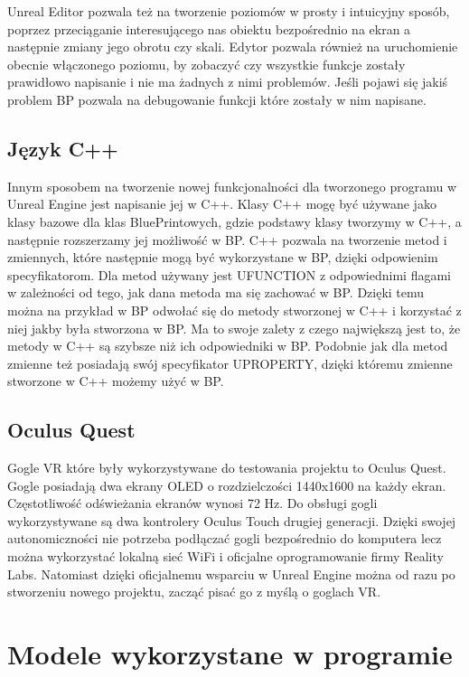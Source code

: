\documentclass[a4paper,12pt,reqno]{article}
\begin{document}
Unreal Editor pozwala też na tworzenie poziomów w prosty i intuicyjny sposób, poprzez przeciąganie interesującego nas obiektu bezpośrednio na ekran a następnie zmiany jego obrotu czy skali. Edytor pozwala również na uruchomienie obecnie włączonego poziomu, by zobaczyć czy wszystkie funkcje zostały prawidłowo napisanie i nie ma żadnych z nimi problemów. Jeśli pojawi się jakiś problem BP pozwala na debugowanie funkcji które zostały w nim napisane. 
\subsection{Język C++}

Innym sposobem na tworzenie nowej funkcjonalności dla tworzonego programu w Unreal Engine jest napisanie jej w C++. Klasy C++ mogę być używane jako klasy bazowe dla klas BluePrintowych, gdzie podstawy klasy tworzymy w C++, a następnie rozszerzamy jej możliwość w BP. C++ pozwala na tworzenie metod i zmiennych, które następnie mogą być wykorzystane w BP, dzięki odpowienim specyfikatorom. Dla metod używany jest UFUNCTION z odpowiednimi flagami w zależności od tego, jak dana metoda ma się zachować w BP. Dzięki temu można na przykład w BP odwołać się do metody stworzonej w C++ i korzystać z niej jakby była stworzona w BP. Ma to swoje zalety z czego największą jest to, że metody w C++ są szybsze niż ich odpowiedniki w BP. Podobnie jak dla metod zmienne też posiadają swój specyfikator UPROPERTY, dzięki któremu zmienne stworzone w C++ możemy użyć w BP.




\subsection{Oculus Quest}

Gogle VR które były wykorzystywane do testowania projektu to Oculus Quest. Gogle posiadają dwa ekrany OLED o rozdzielczości 1440x1600 na każdy ekran. Częstotliwość odświeżania ekranów wynosi 72 Hz. Do obsługi gogli wykorzystywane są dwa kontrolery Oculus Touch drugiej generacji. Dzięki swojej autonomiczności nie potrzeba podłączać gogli bezpośrednio do komputera lecz można wykorzystać lokalną sieć WiFi i oficjalne oprogramowanie firmy Reality Labs. Natomiast dzięki oficjalnemu wsparciu w Unreal Engine można od razu po stworzeniu nowego projektu, zacząć pisać go z myślą o goglach VR.


\section{Modele wykorzystane w programie}
\end{document}
